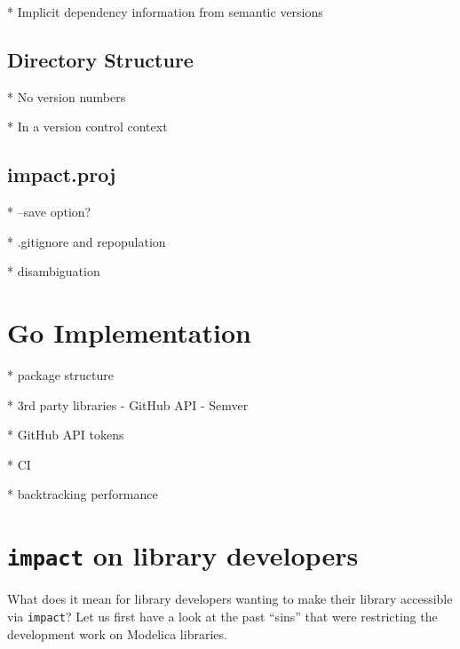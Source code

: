 \documentclass[11pt,a4paper,twocolumn]{article}
\newcommand{\code}[1]{\texttt{#1}} %
\begin{document}
* Implicit dependency information from semantic versions

\subsection{Directory Structure}

* No version numbers

* In a version control context

\subsection{impact.proj}

* --save option?

* .gitignore and repopulation

* disambiguation

\section{Go Implementation}

* package structure

* 3rd party libraries
  - GitHub API
  - Semver

* GitHub API tokens

* CI

* backtracking performance

\section{\code{impact} on library developers}

What does it mean for library developers wanting to make their library
accessible via \code{impact}? Let us first have a look at the past
``sins'' that were restricting the development work on Modelica
libraries.
\end{document}
